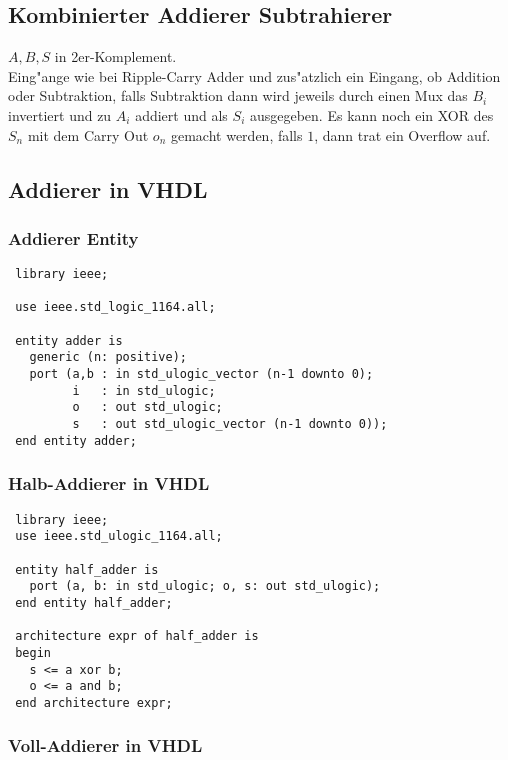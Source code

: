 \documentclass[german, 10pt, a4paper, twocolumn]{scrartcl}
\theoremstyle{definition}
\begin{document}
\subsection{Kombinierter Addierer Subtrahierer}


$A,B,S$ in 2er-Komplement.\\

Eing"ange wie bei Ripple-Carry Adder und zus"atzlich ein Eingang, ob Addition oder Subtraktion, falls Subtraktion dann wird jeweils durch einen Mux das $B_i$ invertiert und zu $A_i$ addiert und als $S_i$ ausgegeben. Es kann noch ein XOR des $S_n$ mit dem Carry Out $o_n$ gemacht werden, falls $1$, dann trat ein Overflow auf.

\subsection{Addierer in VHDL}

\subsubsection{Addierer Entity}

\begin{verbatim}
 library ieee;

 use ieee.std_logic_1164.all;

 entity adder is
   generic (n: positive);
   port (a,b : in std_ulogic_vector (n-1 downto 0);
         i   : in std_ulogic;
         o   : out std_ulogic;
         s   : out std_ulogic_vector (n-1 downto 0));
 end entity adder; 
\end{verbatim}

\subsubsection{Halb-Addierer in VHDL}

\begin{verbatim}
 library ieee;
 use ieee.std_ulogic_1164.all;

 entity half_adder is
   port (a, b: in std_ulogic; o, s: out std_ulogic);
 end entity half_adder;

 architecture expr of half_adder is
 begin
   s <= a xor b;
   o <= a and b;
 end architecture expr;
\end{verbatim}

\subsubsection{Voll-Addierer in VHDL}
\end{document}
